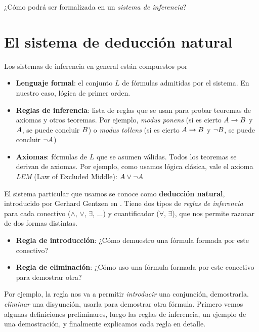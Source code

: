 ¿Cómo podrá ser formalizada en un \textit{sistema de inferencia}?

\section{El sistema de deducción natural}

Los sistemas de inferencia en general están compuestos por

\begin{itemize}
    \item \textbf{Lenguaje formal}: el conjunto $L$ de fórmulas admitidas por
    el sistema. En nuestro caso, lógica de primer orden.
    \item \textbf{Reglas de inferencia}: lista de reglas que se usan para probar
    teoremas de axiomas y otros teoremas. Por ejemplo, \textit{modus ponens} (si
    es cierto $A \to B$ y $A$, se puede concluir $B$) o
    \textit{modus tollens} (si es cierto $A \to B$ y $\neg
    B$, se puede concluir $\neg A$)
    \item \textbf{Axiomas}: fórmulas de $L$ que se asumen válidas. Todos los
    teoremas se derivan de axiomas. Por ejemplo, como usamos lógica clásica,
    vale el axioma \textit{LEM} (Law of Excluded Middle): $A \vee \neg A$
\end{itemize}

El sistema particular que usamos se conoce como \textbf{deducción natural},
introducido por Gerhard Gentzen en \cite{gentzen-1935}. Tiene dos tipos de
\textit{reglas de inferencia} para cada conectivo ($\wedge$, $\vee$, $\exists$,
$\dots$) y cuantificador ($\forall$, $\exists$), que nos permite razonar de dos formas distintas.

\begin{itemize}
    \item \textbf{Regla de introducción}: ¿Cómo demuestro una fórmula formada por este conectivo?
    \item \textbf{Regla de eliminación}: ¿Cómo uso una fórmula formada por este conectivo para demostrar otra?
\end{itemize}

Por ejemplo, la regla  nos va a permitir \textit{introducir} una conjunción, demostrarla.  \textit{eliminar} una disyunción, usarla para demostrar otra fórmula. Primero vemos algunas definiciones preliminares, luego las reglas de inferencia, un ejemplo de una demostración, y finalmente explicamos cada regla en detalle.


